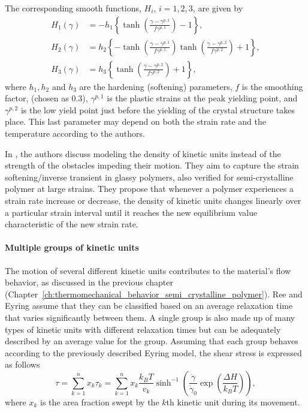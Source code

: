 The corresponding smooth functions, $H_i$, $i=1,2,3$, are given by
\begin{align}
	H_1(\gamma)&=-h_1\left\{\tanh \left(\frac{\gamma-\gamma^{p,1}}{f \gamma^{p,1}}\right)-1\right\}, \\
	H_2(\gamma)&=h_2\left\{-\tanh \left(\frac{\gamma-\gamma^{p,1}}{f \gamma^{p,1}}\right) \tanh \left(\frac{\gamma-\gamma^{p,2}}{f \gamma^{p,2}}\right)+1\right\}, \\
	H_3(\gamma)&=h_3\left\{\tanh \left(\frac{\gamma-\gamma^{p,2}}{f \gamma^{p,2}}\right)+1\right\},
\end{align}
where $h_1, h_2$ and $h_3$ are the hardening (softening) parameters, $f$ is the smoothing factor, (chosen as $0.3$), $\gamma^{p,1}$ is the plastic strains at the peak yielding point, and $\gamma^{p,2}$ is the low yield point just before the yielding of the crystal structure takes place.
This last parameter may depend on both the strain rate and the temperature according to the authors.


In \cite{gsellYieldTransientEffects1981}, the authors discuss modeling the density of kinetic units instead of the strength of the obstacles impeding their motion.
They aim to capture the strain softening/inverse transient in glassy polymers, also verified for semi-crystalline polymer at large strains.
They propose that whenever a polymer experiences a strain rate increase or decrease, the density of kinetic units changes linearly over a particular strain interval until it reaches the new equilibrium value characteristic of the new strain rate.

\paragraph{Multiple groups of kinetic units}

The motion of several different kinetic units contributes to the material's flow behavior, as discussed in the previous chapter (Chapter~\ref{ch:thermomechanical_behavior_semi_crystalline_polymer}).
Ree and Eyring \citep{reeTheoryNonNewtonian1955} assume that they can be classified based on an average relaxation time that varies significantly between them.
A single group is also made up of many types of kinetic units with different relaxation times but can be adequately described by an average value for the group.
Assuming that each group behaves according to the previously described Eyring model, the shear stress is expressed as follows
\begin{equation}
	\tau=\sum_{k=1}^n x_k \tau_k = \sum_{k=1}^n x_k\frac{k_B T}{v_k} \sinh^{-1}\left(\frac{\dot\gamma}{\dot\gamma_0}\exp\left(\frac{\Delta H}{k_B T}\right)\right),
\end{equation}
where $x_k$ is the area fraction swept by the $k$th kinetic unit during its movement.

